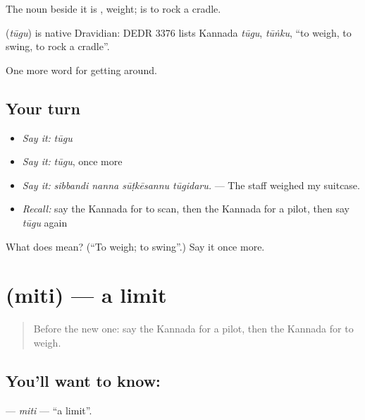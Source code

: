 The noun beside it is , weight;   is to rock a cradle.

\begin{cousinweb}
\textbf{} (\emph{tūgu}) is native Dravidian: DEDR 3376 lists Kannada \emph{tūgu}, \emph{tūṅku}, \textquotedblleft{}to weigh, to swing, to rock a cradle\textquotedblright{}.
\end{cousinweb}

\begin{grammarlens}[title={What you've built}]
One more word for getting around.
\end{grammarlens}

\subsection*{Your turn}
\begin{itemize}
\raggedright
  \item \emph{Say it:} \emph{tūgu}
  \item \emph{Say it:} \emph{tūgu}, once more
  \item \emph{Say it:} \emph{sibbandi nanna sūṭkēsannu tūgidaru.} — The staff weighed my suitcase.
  \item \emph{Recall:} say the Kannada for to scan, then the Kannada for a pilot, then say \emph{tūgu} again
\end{itemize}

\begin{tcolorbox}[breakable,colback=teal!4,colframe=teal!35!black,title={Before you move on}]
What does  mean? (\textquotedblleft{}To weigh; to swing\textquotedblright{}.) Say it once more.
\end{tcolorbox}
\section[\texorpdfstring{\kn{ಮಿತಿ} (miti)}{ಮಿತಿ (miti)}]{ (miti) — a limit}

\label{lesson:KA-C438-miti}



\begin{quote}
Before the new one: say the Kannada for a pilot, then the Kannada for to weigh.
\end{quote}

\subsection*{You'll want to know: }
\textbf{} — \emph{miti} — \textquotedblleft{}a limit\textquotedblright{}.

